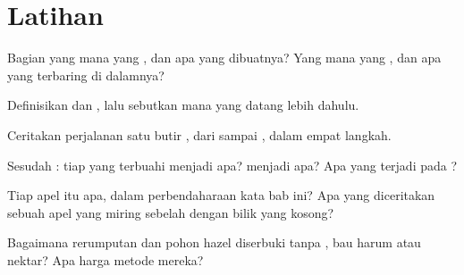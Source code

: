 \section{Latihan}

\begin{exercise}[$\star$]\label{exo:g5:flower-to-fruit:1}
Bagian  yang mana yang , dan apa yang dibuatnya? Yang mana
yang , dan apa yang terbaring di dalamnya?
\end{exercise}

\begin{exercise}[$\star$]\label{exo:g5:flower-to-fruit:2}
Definisikan  dan , lalu sebutkan mana yang datang
lebih dahulu.
\end{exercise}

\begin{exercise}[$\star$]\label{exo:g5:flower-to-fruit:3}
Ceritakan perjalanan satu butir , dari  sampai
, dalam empat langkah.
\end{exercise}

\begin{exercise}[$\star$]\label{exo:g5:flower-to-fruit:4}
Sesudah : tiap  yang terbuahi menjadi apa? 
menjadi apa? Apa yang terjadi pada ?
\end{exercise}

\begin{exercise}[$\star$]\label{exo:g5:flower-to-fruit:5}
Tiap  apel itu apa, dalam perbendaharaan kata bab ini? Apa yang
diceritakan sebuah apel yang miring sebelah dengan bilik yang kosong?
\end{exercise}

\begin{exercise}[$\star$]\label{exo:g5:flower-to-fruit:6}
Bagaimana rerumputan dan pohon hazel diserbuki tanpa ,
bau harum atau nektar? Apa harga metode mereka?
\end{exercise}

